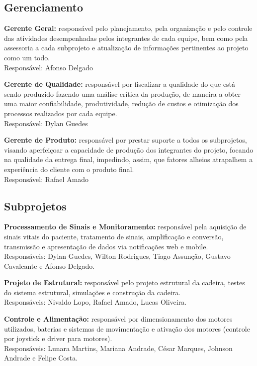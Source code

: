 \subsection{Gerenciamento}

\textbf{Gerente Geral:} responsável pelo planejamento, pela organização e pelo controle das atividades desempenhadas pelos integrantes de cada equipe, bem como pela assessoria a cada subprojeto e atualização de informações pertinentes ao projeto como um todo.
\\Responsável: Afonso Delgado

\textbf{Gerente de Qualidade:} responsável por fiscalizar a qualidade do que está sendo produzido fazendo uma análise crítica da produção, de maneira a obter uma maior confiabilidade, produtividade, redução de custos e otimização dos processos realizados por cada equipe.
\\Responsável: Dylan Guedes

\textbf{Gerente de Produto:} responsável por prestar suporte a todos os subprojetos, visando aperfeiçoar a capacidade de produção dos integrantes do projeto, focando na qualidade da entrega final, impedindo, assim,  que fatores alheios atrapalhem a experiência do cliente com o produto final.
\\Responsável: Rafael Amado

\subsection{Subprojetos}

\textbf{Processamento de Sinais e Monitoramento:} responsável pela aquisição de sinais vitais do paciente,
tratamento de sinais, amplificação e conversão, transmissão e apresentação de
dados via notificações web e mobile.
\\Responsáveis: Dylan Guedes, Wilton Rodrigues, Tiago Assunção, Gustavo Cavalcante e Afonso Delgado.

\textbf{Projeto de Estrutural:} responsável pelo projeto estrutural da cadeira, testes
do sistema estrutural, simulações e construção da cadeira.
\\Responsáveis: Nivaldo Lopo, Rafael Amado, Lucas Oliveira.

\textbf{Controle e Alimentação:} responsável por dimensionamento dos motores utilizados,
baterias e sistemas de movimentação e ativação dos motores (controle por
joystick e driver para motores).
\\Responsáveis: Lunara Martins, Mariana Andrade, César Marques, Johnson Andrade e Felipe Costa.

